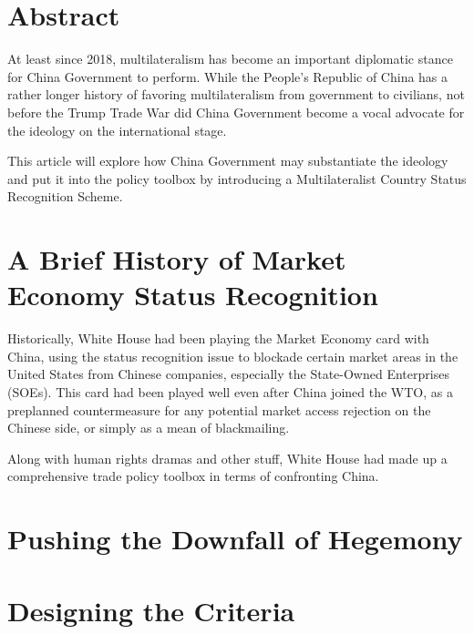 

\usepackage{multicol}




\section*{Abstract}

At least since 2018, multilateralism has become an important diplomatic stance for China Government to perform. While the People's Republic of China has a rather longer history of favoring multilateralism from government to civilians, not before the Trump Trade War did China Government become a vocal advocate for the ideology on the international stage.

This article will explore how China Government may substantiate the ideology and put it into the policy toolbox by introducing a Multilateralist Country Status Recognition Scheme.

\maketoc{\small}{\clearpage}

\section{A Brief History of Market Economy Status Recognition}
Historically, White House had been playing the Market Economy card with China, using the status recognition issue to blockade certain market areas in the United States from Chinese companies, especially the State-Owned Enterprises (SOEs). This card had been played well even after China joined the WTO, as a preplanned countermeasure for any potential market access rejection on the Chinese side, or simply as a mean of blackmailing.

Along with human rights dramas and other stuff, White House had made up a comprehensive trade policy toolbox in terms of confronting China.

\section{Pushing the Downfall of Hegemony}
\section{Designing the Criteria}
